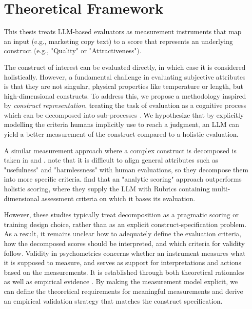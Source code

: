 
\section{Theoretical Framework}\label{sec:theoretical_framework}

This thesis treats LLM-based evaluators as measurement instruments that map an input (e.g., marketing copy text) to a score that represents an underlying construct (e.g., "Quality" or "Attractiveness"). 



The construct of interest can be evaluated directly, in which case it is considered holistically. However, a fundamental challenge in evaluating subjective attributes is that they are not singular, physical properties like temperature or length, but high-dimensional constructs. To address this, we propose a methodology inspired by \textit{construct representation}, treating the task of evaluation as a cognitive process which can be decomposed into sub-processes \citep{whitely1983construct, messick_validity_1994}. We hypothesize that by explicitly modelling the criteria humans implicitly use to reach a judgment, an LLM can yield a better measurement of the construct compared to a holistic evaluation.

A similar measurement approach where a complex construct is decomposed is taken in \citet{li-fine-grained-2026} and \citet{wang2025evaluating}. \citet{li-fine-grained-2026} note that it is difficult to align general attributes such as "usefulness" and "harmlessness" with human evaluations, so they decompose them into more specific criteria. \citet{wang2025evaluating} find that an "analytic scoring" approach outperforms holistic scoring, where they supply the LLM with Rubrics containing multi-dimensional assessment criteria on which it bases its evaluation. 

However, these studies typically treat decomposition as a pragmatic scoring or training design choice, rather than as an explicit construct-specification problem. As a result, it remains unclear how to adequately define the evaluation criteria, how the decomposed scores should be interpreted, and which criteria for validity follow. Validity in psychometrics concerns whether an instrument measures what it is supposed to measure, and serves as support for interpretations and actions based on the measurements. It is established through both theoretical rationales as well as empirical evidence \citep{messick1989meaning}. By making the measurement model explicit, we can define the theoretical requirements for meaningful measurements and derive an empirical validation strategy that matches the construct specification.  

